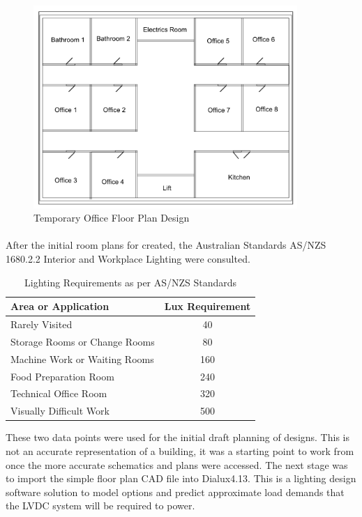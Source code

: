 \begin{figure}[H]
\hfill\includegraphics[width = 100mm]{images/Rough_Floorplan}\hspace*{\fill}
\caption{Temporary Office Floor Plan Design} 
\label{fig:RoughFloorplan}
\end{figure} 

\paragraph{}
After the initial room plans for created, the Australian Standards AS/NZS 1680.2.2 Interior and Workplace Lighting were consulted. 

\begin{table}[!ht]
\centering
\renewcommand{\arraystretch}{2}
\begin{tabular}{|l|c|}
\hline
\textbf{Area or Application} & \multicolumn{1}{l|}{\textbf{Lux Requirement}} \\ \hline
Rarely Visited & 40 \\ \hline
Storage Rooms or Change Rooms & 80 \\ \hline
Machine Work or Waiting Rooms & 160 \\ \hline
Food Preparation Room & 240 \\ \hline
Technical Office Room & 320 \\ \hline
Visually Difficult Work & 500 \\ \hline
\end{tabular}
\caption{Lighting Requirements as per AS/NZS Standards \cite{StandardsAustralia2006}}
\label{LightingRequirements}
\end{table}

These two data points were used for the initial draft planning of designs. This is not an accurate representation of a building, it was a starting point to work from once the more accurate schematics and plans were accessed. The next stage was to import the simple floor plan CAD file into Dialux4.13. This is a lighting design software solution to model options and predict approximate load demands that the LVDC system will be required to power.  

